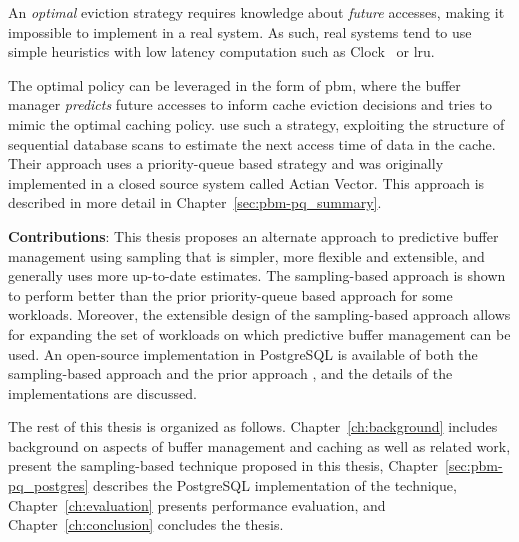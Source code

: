 An \textit{optimal} eviction strategy requires knowledge about \textit{future} accesses, making it impossible to implement in a real system. As such, real systems tend to use simple heuristics with low latency computation such as Clock~\cite{gclock} or \gls{lru}.

The optimal policy can be leveraged in the form of \gls{pbm}, where the buffer manager \textit{predicts} future accesses to inform cache eviction decisions and tries to mimic the optimal caching policy. \citet{pbm} use such a strategy, exploiting the structure of sequential database scans to estimate the next access time of data in the cache. Their approach uses a priority-queue based strategy and was originally implemented in a closed source system called Actian Vector. This approach is described in more detail in Chapter~\ref{sec:pbm-pq_summary}.

\textbf{Contributions}: This thesis proposes an alternate approach to predictive buffer management using sampling that is simpler, more flexible and extensible, and generally uses more up-to-date estimates. The sampling-based approach is shown to perform better than the prior priority-queue based approach for some workloads. Moreover, the extensible design of the sampling-based approach allows for expanding the set of workloads on which predictive buffer management can be used. An open-source implementation in PostgreSQL is available of both the sampling-based approach and the prior approach \cite{pbm}, and the details of the implementations are discussed.

The rest of this thesis is organized as follows. Chapter~\ref{ch:background} includes background on aspects of buffer management and caching as well as related work,  present the sampling-based technique proposed in this thesis, Chapter~\ref{sec:pbm-pq_postgres} describes the PostgreSQL implementation of the technique, Chapter~\ref{ch:evaluation} presents performance evaluation, and Chapter~\ref{ch:conclusion} concludes the thesis.